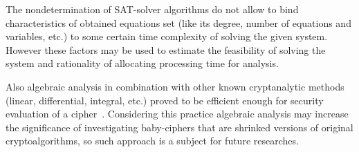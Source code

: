 The nondetermination of SAT-solver algorithms do not allow to bind
characteristics of obtained equations set (like its degree, number of equations
and variables, etc.) to some certain time complexity of solving the given
system. However these factors may be used to estimate the feasibility of
solving the system and rationality of allocating processing time for analysis.

Also algebraic analysis in combination with other known cryptanalytic methods
(linear, differential, integral, etc.) proved to be efficient enough for
security evaluation of a cipher~\cite{Albrecht2010}. Considering this practice
algebraic analysis may increase the significance of investigating baby-ciphers
that are shrinked versions of original cryptoalgorithms, so such approach is a
subject for future researches.

